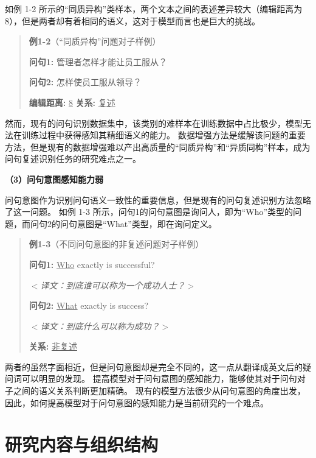如例 1-2 所示的“同质异构”类样本，两个文本之间的表述差异较大（编辑距离为8），但是两者却有着相同的语义，这对于模型而言也是巨大的挑战。

\begin{quotation}
    \noindent \textbf{\songti 例1-2}（“同质异构”问题对子样例）
    
    \noindent \textbf{问句1:} 管理者怎样才能让员工服从？
    
    \noindent \textbf{问句2:} 怎样使员工服从领导？
    
    \noindent \textbf{编辑距离:}  \underline{8}  \qquad \textbf{关系:} \underline{复述}
    
\end{quotation}

然而，现有的问句识别数据集中，该类别的难样本在训练数据中占比极少，模型无法在训练过程中获得感知其精细语义的能力。
数据增强方法是缓解该问题的重要方法，但是现有的数据增强难以产出高质量的“同质异构”和“异质同构”样本，成为问句复述识别任务的研究难点之一。

\textbf{\songti （3）问句意图感知能力弱}

问句意图作为识别问句语义一致性的重要信息，但是现有的问句复述识别方法忽略了这一问题。
如例 1-3 所示，问句1的问句意图是询问人，即为“Who”类型的问题，而问句2的问句意图是“What”类型，即在询问定义。
\begin{quotation}
    \noindent \textbf{\songti 例1-3}（不同问句意图的非复述问题对子样例）
    
    \noindent \textbf{问句1:} \underline{Who} exactly is successful?

    \noindent $<$\textit{译文：到底谁可以称为一个成功人士？}$>$
    
    \noindent \textbf{问句2:}  \underline{What} exactly is success?

    \noindent $<$\textit{译文：到底什么可以称为成功？}$>$
    
    \noindent \textbf{关系:} \underline{非复述}
    
\end{quotation}

两者的虽然字面相近，但是问句意图却是完全不同的，这一点从翻译成英文后的疑问词可以明显的发现。
提高模型对于问句意图的感知能力，能够使其对于问句对子之间的语义关系判断更加精确。
现有的模型方法很少从问句意图的角度出发，因此，如何提高模型对于问句意图的感知能力是当前研究的一个难点。


\section{研究内容与组织结构}


